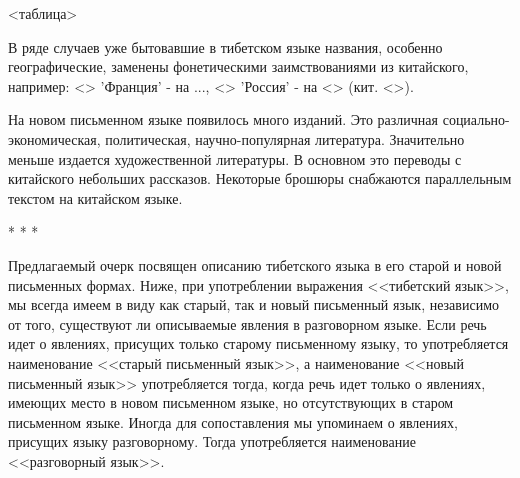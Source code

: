 <таблица>

В ряде случаев уже бытовавшие в тибетском языке названия, особенно географические, заменены фонетическими заимствованиями из китайского, например: <> 'Франция' - на ..., <> 'Россия' - на <> (кит. <>).

На новом письменном языке появилось много изданий. Это различная социально-экономическая, политическая, научно-популярная литература. Значительно меньше издается художественной литературы. В основном это переводы с китайского небольших рассказов. Некоторые брошюры снабжаются параллельным текстом на китайском языке.

* * *

Предлагаемый очерк посвящен описанию тибетского языка в его старой и новой письменных формах. Ниже, при употреблении выражения <<тибетский язык>>, мы всегда имеем в виду как старый, так и новый письменный язык, независимо от того, существуют ли описываемые явления в разговорном языке.
Если речь идет о явлениях, присущих только старому письменному языку, то употребляется наименование <<старый письменный язык>>, а наименование <<новый письменный язык>> употребляется тогда, когда речь идет только о явлениях, имеющих место в новом письменном языке, но отсутствующих в старом письменном языке.
Иногда для сопоставления мы упоминаем о явлениях, присущих языку разговорному. Тогда употребляется наименование <<разговорный язык>>.

